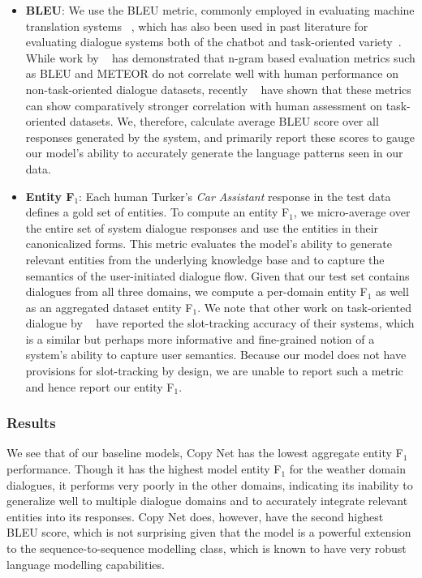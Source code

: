 \documentclass[11pt,a4paper]{article}
\begin{document}
\begin{itemize}
  \item \textbf{BLEU}: We use the BLEU metric, commonly employed in evaluating machine translation systems ~\cite{papineni-EtAl:2002:ACL}, which has also been used in past literature for evaluating dialogue systems both of the chatbot and task-oriented variety~\cite{Ritter:11a,li-EtAl:2016:N16-11,Wen:16}. While work by ~\cite{liu-EtAl:2016:EMNLP20163} has demonstrated that n-gram based evaluation metrics such as BLEU and METEOR do not correlate well with human performance on non-task-oriented dialogue datasets, recently ~\cite{Sharma:17} have shown that these metrics can show comparatively stronger correlation with human assessment on task-oriented datasets. We, therefore, calculate average BLEU score over all responses generated by the system, and primarily report these scores to gauge our model's ability to accurately generate the language patterns seen in our data.  

  \item \textbf{Entity F$_1$}: Each human Turker's \emph{Car Assistant} response in the test data defines a gold set of entities. To compute an entity F$_1$, we micro-average over the entire set of system dialogue responses and use the entities in their canonicalized forms. This metric evaluates the model's ability to generate relevant entities from the underlying knowledge base and to capture the semantics of the user-initiated dialogue flow. Given that our test set contains dialogues from all three domains, we compute a per-domain entity F$_1$ as well as an aggregated dataset entity F$_1$. We note that other work on task-oriented dialogue by ~\cite{Wen:16,Henderson:14} have reported the slot-tracking accuracy of their systems, which is a similar but perhaps more informative and fine-grained notion of a system's ability to capture user semantics. Because our model does not have provisions for slot-tracking by design, we are unable to report such a metric and hence report our entity F$_1$. 

\end{itemize}

\subsubsection{Results}


We see that of our baseline models, Copy Net has the lowest aggregate entity F$_1$ performance. Though it has the highest model entity F$_1$ for the weather domain dialogues, it performs very poorly in the other domains, indicating its inability to generalize well to multiple dialogue domains and to accurately integrate relevant entities into its responses. Copy Net does, however, have the second highest BLEU score, which is not surprising given that the model is a powerful extension to the sequence-to-sequence modelling class, which is known to have very robust language modelling capabilities. 
\end{document}
